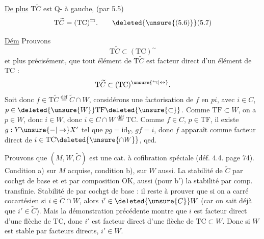  \uline{De plus} $\mathrm{T}\widetilde C$ est Q- à gauche,  (par 5.5)
\[
\mathrm{T}\widetilde C=(\mathrm{TC})^{\leftrightarrows}.\tag*{\deleted{\unsure{(5.6)}}(5.7)}
\]

\uline{Dém} Prouvons
\[
\mathrm{T}\widetilde C\subset(\mathrm{TC})^{\sim}
\]
et plus précisément, que tout élément de $\mathrm{T}\widetilde C$ est facteur direct d'un élément de $\mathrm{TC}$ :
\[
\mathrm{T}\widetilde C\subset(\mathrm{TC})^{\unsure{\leftrightarrows|\leftrightarrow}}.
\]
Soit donc $f\in\mathrm{T}\widetilde C\overset{\mathrm{déf}}{=}\widetilde C\cap W$, considérons une
factorisation de $f$ en $pi$, avec $i\in C$, $p\in\deleted{\unsure{W}}\mathrm{TF}\deleted{\unsure{\subset}}$. Comme $\mathrm{TF}\subset W$, on a $p\in W$, donc $i\in W$, donc $i\in C\cap W\overset{\mathrm{déf}}{=}\mathrm{TC}$. Comme $f\in C$, $p\in\mathrm{TF}$, il existe $g:Y\unsure{\mathbin{-}|\to}X'$ tel que $pg=\mathrm{id}_Y$, $gf=i$, donc $f$ apparaît comme facteur direct de $i\in\mathrm{TC}\deleted{\unsure{\cap W}}$, qed.

Prouvons que $(M,W,\widetilde C)$ est une cat. à cofibration spéciale (déf. 4.4. page 74). Condition a) sur $M$ acquise, condition b),  sur $W$ aussi. La stabilité de $\widetilde C$ par cochgt de base et et par composition OK, aussi (pour b$'$) la stabilité par comp. transfinie. Stabilité de  par cochgt de base : il reste à prouver que si on a carré cocartésien
si $i\in\widetilde C\cap W$, alors $i'\in\deleted{\unsure{C}} W$ (car on sait déjà que $i'\in\widetilde C$). Mais la démonstration précédente montre que $i$ est facteur direct  d'une flèche de $\mathrm{TC}$, donc $i'$ est facteur direct d'une flèche de $\mathrm{TC}\subset W$.  Donc si $W$ est stable par facteurs directs,  $i'\in W$.

